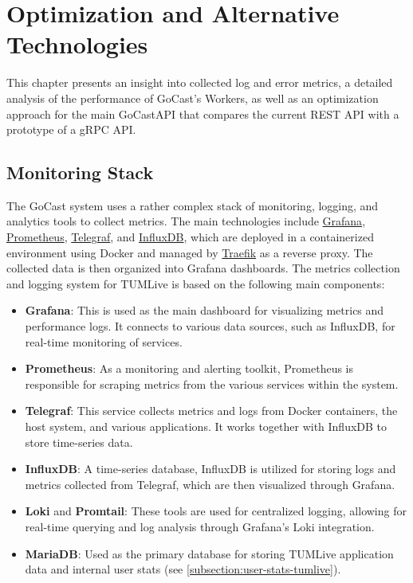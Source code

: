 
\chapter{Optimization and Alternative Technologies}\label{chapter:optimization_and_alternative_technologies}

This chapter presents an insight into collected log and error metrics, a detailed analysis of the performance of GoCast's Workers, as well as an optimization approach for the main GoCast\ac{API} that compares the current REST \ac{API} with a prototype of a gRPC \ac{API}.   

\section{Monitoring Stack}

The GoCast system uses a rather complex stack of monitoring, logging, and analytics tools to collect metrics. The main technologies include \href{https://github.com/grafana/grafana}{Grafana}, \href{https://github.com/prometheus/prometheus}{Prometheus}, \href{https://github.com/influxdata/telegraf}{Telegraf}, and \href{https://github.com/influxdata/influxdb}{InfluxDB}, which are deployed in a containerized environment using Docker and managed by \href{https://github.com/traefik/traefik}{Traefik} as a reverse proxy. The collected data is then organized into Grafana dashboards. The metrics collection and logging system for TUMLive is based on the following main components:
\begin{itemize}
    \item \textbf{Grafana}: This is used as the main dashboard for visualizing metrics and performance logs. It connects to various data sources, such as InfluxDB, for real-time monitoring of services.
    \item \textbf{Prometheus}: As a monitoring and alerting toolkit, Prometheus is responsible for scraping metrics from the various services within the system.
    \item \textbf{Telegraf}: This service collects metrics and logs from Docker containers, the host system, and various applications. It works together with InfluxDB to store time-series data.
    \item \textbf{InfluxDB}: A time-series database, InfluxDB is utilized for storing logs and metrics collected from Telegraf, which are then visualized through Grafana.
    \item \textbf{Loki} and \textbf{Promtail}: These tools are used for centralized logging, allowing for real-time querying and log analysis through Grafana's Loki integration.
    \item \textbf{MariaDB}: Used as the primary database for storing TUMLive application data and internal user stats (see \autoref{subsection:user-stats-tumlive}).
\end{itemize}

